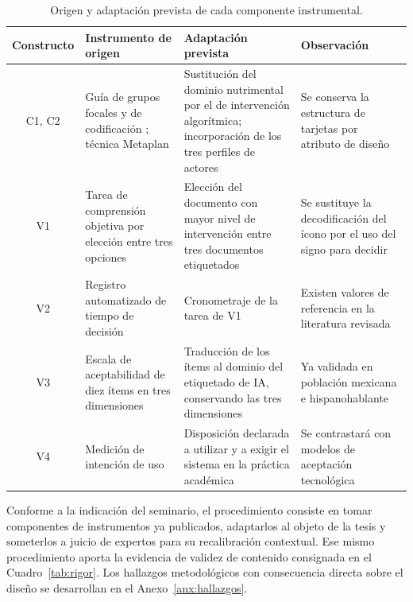 \documentclass[letter,12pt]{article}
\begin{document}
\begin{table}[H]
\centering
\footnotesize
\caption{Origen y adaptación prevista de cada componente instrumental.}
\label{tab:adaptacion}
\renewcommand{\arraystretch}{1.35}
\begin{tabular}{|c|p{3.4cm}|p{3.6cm}|p{4.0cm}|}
\hline
\rowcolor{bgCotejo}
\textbf{Constructo} & \textbf{Instrumento de origen} & \textbf{Adaptación prevista} & \textbf{Observación} \\
\hline
C1, C2 & Guía de grupos focales y de codificación \citep{vargasmeza2019comprension}; técnica Metaplan \citep{reyes2019desarrollo,cortes2004metaplan} & Sustitución del dominio nutrimental por el de intervención algorítmica; incorporación de los tres perfiles de actores & Se conserva la estructura de tarjetas por atributo de diseño \\
\hline
V1 & Tarea de comprensión objetiva por elección entre tres opciones \citep{vargasmeza2019aceptabilidad} & Elección del documento con mayor nivel de intervención entre tres documentos etiquetados & Se sustituye la decodificación del ícono por el uso del signo para decidir \\
\hline
V2 & Registro automatizado de tiempo de decisión \citep{vargasmeza2019aceptabilidad} & Cronometraje de la tarea de V1 & Existen valores de referencia en la literatura revisada \\
\hline
V3 & Escala de aceptabilidad de diez ítems en tres dimensiones \citep{vargasmeza2019aceptabilidad} & Traducción de los ítems al dominio del etiquetado de IA, conservando las tres dimensiones & Ya validada en población mexicana e hispanohablante \\
\hline
V4 & Medición de intención de uso \citep{jauregui2020intenciones} & Disposición declarada a utilizar y a exigir el sistema en la práctica académica & Se contrastará con modelos de aceptación tecnológica \\
\hline
\end{tabular}
\end{table}

Conforme a la indicación del seminario, el procedimiento consiste en tomar componentes de instrumentos ya publicados, adaptarlos al objeto de la tesis y someterlos a juicio de expertos para su recalibración contextual. Ese mismo procedimiento aporta la evidencia de validez de contenido consignada en el Cuadro~\ref{tab:rigor}. Los hallazgos metodológicos con consecuencia directa sobre el diseño se desarrollan en el Anexo~\ref{anx:hallazgos}.

\end{document}
